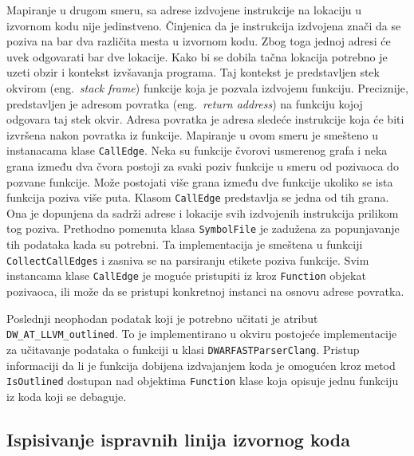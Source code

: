 \documentclass[12pt,oneside]{memoir}
\begin{document}
Mapiranje u drugom smeru, sa adrese izdvojene instrukcije na lokaciju u izvornom kodu nije jedinstveno.
Činjenica da je instrukcija izdvojena znači da se poziva na bar dva različita mesta u izvornom kodu.
Zbog toga jednoj adresi će uvek odgovarati bar dve lokacije. 
Kako bi se dobila tačna lokacija potrebno je uzeti obzir i kontekst izvšavanja programa.
Taj kontekst je predstavljen stek okvirom (eng.~{\em stack frame}) funkcije koja je pozvala izdvojenu funkciju.
Preciznije, predstavljen je adresom povratka (eng.~{\em return address}) na funkciju kojoj odgovara taj stek okvir.
Adresa povratka je adresa sledeće instrukcije koja će biti izvršena nakon povratka iz funkcije.
Mapiranje u ovom smeru je smešteno u instanacama klase \verb|CallEdge|.
Neka su funkcije čvorovi usmerenog grafa i neka grana između dva čvora postoji za svaki poziv funkcije u smeru od pozivaoca do pozvane funkcije.
Može postojati više grana između dve funkcije ukoliko se ista funkcija poziva više puta.
Klasom \verb|CallEdge| predstavlja se jedna od tih grana.
Ona je dopunjena da sadrži adrese i lokacije svih izdvojenih instrukcija prilikom tog poziva.
Prethodno pomenuta klasa \verb|SymbolFile| je zadužena za popunjavanje tih podataka kada su potrebni.
Ta implementacija je smeštena u funkciji \verb|CollectCallEdges| i zasniva se na parsiranju etikete poziva funkcije.
Svim instancama klase \verb|CallEdge| je moguće pristupiti iz kroz \verb|Function| objekat pozivaoca, ili može da se pristupi konkretnoj instanci na osnovu adrese povratka.

Poslednji neophodan podatak koji je potrebno učitati je atribut \verb|DW_AT_LLVM_outlined|.
To je implementirano u okviru postojeće implementacije za učitavanje podataka o funkciji u klasi \verb|DWARFASTParserClang|.
Pristup informaciji da li je funkcija dobijena izdvajanjem koda je omogućen kroz metod \verb|IsOutlined| dostupan nad objektima \verb|Function| klase koja opisuje jednu funkciju iz koda koji se debaguje.

\subsection{Ispisivanje ispravnih linija izvornog koda}
\end{document}
